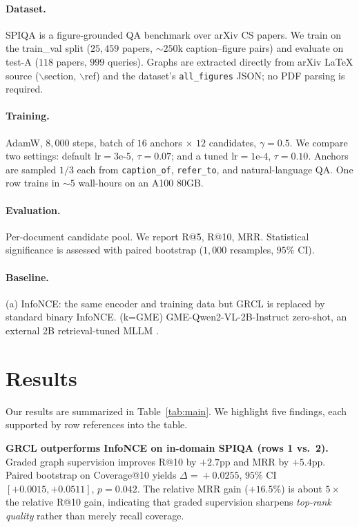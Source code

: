 \documentclass{article}
\begin{document}
\paragraph{Dataset.} SPIQA \cite{spiqa} is a figure-grounded QA benchmark over
arXiv CS papers. We train on the train\_val split ($25{,}459$ papers,
$\sim$$250$k caption--figure pairs) and evaluate on test-A ($118$ papers,
$999$ queries). Graphs are extracted directly from arXiv LaTeX source
($\backslash\!$section, $\backslash\!$ref) and the dataset's
\texttt{all\_figures} JSON; no PDF parsing is required.

\paragraph{Training.} Adam\-W, $8{,}000$ steps, batch of $16$ anchors $\times$ $12$
candidates, $\gamma\!=\!0.5$. We compare two settings: default
$\text{lr}\!=\!3\mathrm{e}\text{-}5$, $\tau\!=\!0.07$; and a tuned
$\text{lr}\!=\!1\mathrm{e}\text{-}4$, $\tau\!=\!0.10$. Anchors are sampled
$1/3$ each from \texttt{caption\_of}, \texttt{refer\_to}, and natural-language
QA. One row trains in $\sim$$5$ wall-hours on an A100 80GB.

\paragraph{Evaluation.} Per-document candidate pool. We report R@5, R@10, MRR.
Statistical significance is assessed with paired bootstrap ($1{,}000$
resamples, $95\%$ CI).

\paragraph{Baseline.} (a) InfoNCE: the same encoder and training data but
GRCL is replaced by standard binary InfoNCE. (k=GME) GME-Qwen2-VL-2B-Instruct
zero-shot, an external 2B retrieval-tuned MLLM \cite{gme}.

\section{Results}

Our results are summarized in Table~\ref{tab:main}. We highlight five
findings, each supported by row references into the table.

\textbf{GRCL outperforms InfoNCE on in-domain SPIQA (rows 1 vs.\ 2).}
Graded graph supervision improves R@10 by $+2.7$pp and MRR by $+5.4$pp.
Paired bootstrap on Coverage@10 yields $\Delta\!=\!+0.0255$, $95\%$ CI
$[+0.0015,+0.0511]$, $p\!=\!0.042$. The relative MRR gain ($+16.5\%$) is
about $5\times$ the relative R@10 gain, indicating that graded supervision
sharpens \emph{top-rank quality} rather than merely recall coverage.
\end{document}
